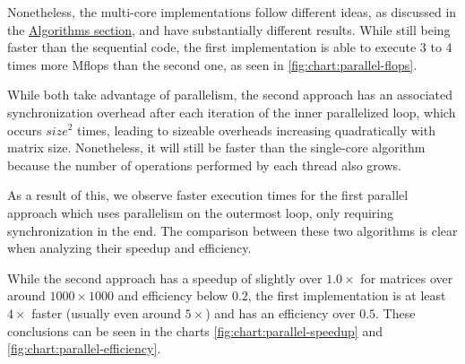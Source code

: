 Nonetheless, the multi-core implementations follow different ideas, as discussed in the \hyperref[section:algorithms]{Algorithms section}, and have substantially different results. While still being faster than the sequential code, the first implementation is able to execute 3 to 4 times more Mflops than the second one, as seen in \ref{fig:chart:parallel-flops}.

While both take advantage of parallelism, the second approach has an associated synchronization overhead after each iteration of the inner parallelized loop, which occurs $size^2$ times, leading to sizeable overheads increasing quadratically with matrix size. Nonetheless, it will still be faster than the single-core algorithm because the number of operations performed by each thread also grows.

As a result of this, we observe faster execution times for the first parallel approach which uses parallelism on the outermost loop, only requiring synchronization in the end. The comparison between these two algorithms is clear when analyzing their speedup and efficiency.

While the second approach has a speedup of slightly over $1.0\times$ for matrices over around $1000 \times 1000$ and efficiency below $0.2$, the first implementation is at least $4\times$ faster (usually even around $5\times$) and has an efficiency over $0.5$. These conclusions can be seen in the charts \ref{fig:chart:parallel-speedup} and \ref{fig:chart:parallel-efficiency}.


